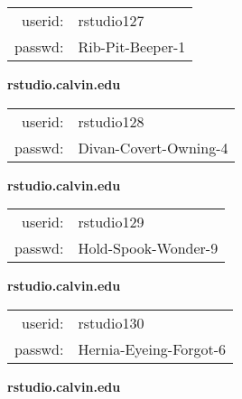 \documentclass{article}\usepackage[]{graphicx}\usepackage[]{color}
\begin{document}
\begin{multicols}{3}
\begin{minipage}{.3\textwidth}
\begin{tabular}{rl}
userid: & rstudio127\\
passwd: & Rib-Pit-Beeper-1

\vspace{5mm}

\end{tabular}\end{minipage}

\vspace{5mm}

\begin{minipage}{.3\textwidth}
\centerline{\textbf{rstudio.calvin.edu}}
\medskip
\begin{tabular}{rl}

userid: & rstudio128\\
passwd: & Divan-Covert-Owning-4

\vspace{5mm}

\end{tabular}\end{minipage}

\vspace{5mm}

\begin{minipage}{.3\textwidth}
\centerline{\textbf{rstudio.calvin.edu}}
\medskip
\begin{tabular}{rl}

userid: & rstudio129\\
passwd: & Hold-Spook-Wonder-9

\vspace{5mm}

\end{tabular}\end{minipage}

\vspace{5mm}

\begin{minipage}{.3\textwidth}
\centerline{\textbf{rstudio.calvin.edu}}
\medskip
\begin{tabular}{rl}

userid: & rstudio130\\
passwd: & Hernia-Eyeing-Forgot-6

\vspace{5mm}

\end{tabular}\end{minipage}

\vspace{5mm}

\begin{minipage}{.3\textwidth}
\centerline{\textbf{rstudio.calvin.edu}}
\medskip
\begin{tabular}{rl}


\end{tabular}
\end{minipage}
\end{multicols}
\end{document}
